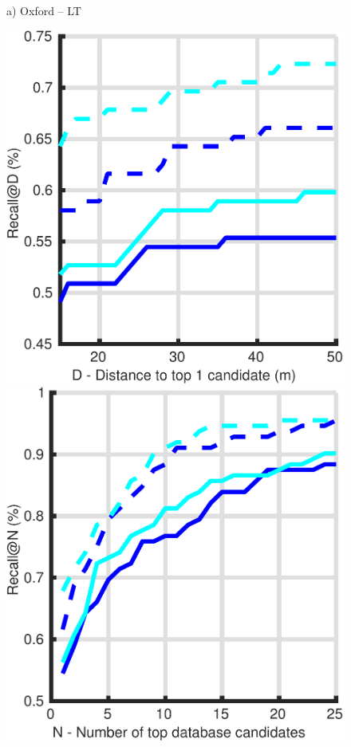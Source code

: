 \begin{figure}
\begin{minipage}{0.16\linewidth}
		a) Oxford -- LT
	\end{minipage}
	\begin{minipage}{0.16\linewidth}
		\center \scriptsize
		\includegraphics[width=\linewidth]{plot/night_ft/Results_snow_queries/distance}	
		
		\includegraphics[width=\linewidth]{plot/night_ft/Results_snow_queries/recall}
				

\end{minipage}
\end{figure}

